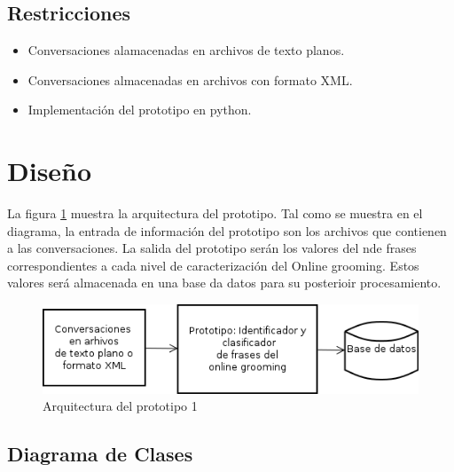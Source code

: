 \subsection{Restricciones}
\begin{itemize}
\item Conversaciones alamacenadas en archivos de texto planos.
\item Conversaciones almacenadas en archivos con formato XML.
\item Implementaci\'on del prototipo en python.

\end{itemize}

\section{Dise\~no}

La figura \ref{fig:arquitectura_prototipo2} muestra la arquitectura del prototipo. Tal como se muestra en el diagrama, la entrada de informaci\'on del prototipo son los archivos que contienen a las conversaciones. La salida del prototipo ser\'an los valores del n\umero de frases correspondientes a cada nivel de caracterizaci\'on del Online grooming. Estos valores ser\'a almacenada en una base da datos para su posterioir procesamiento.



	\begin{figure}[!h]
	\begin{center}
	\includegraphics[scale=.5]{images/arquitectura_prototipo1}
	\caption{Arquitectura del prototipo 1}
	\label{fig:arquitectura_prototipo2}
	\end{center}
	\end{figure}


\subsection{Diagrama de Clases}


